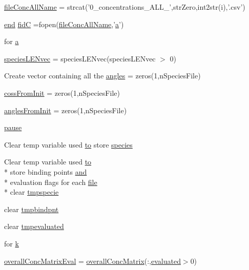 \begin{DoxyCompactItemize}
\item 
\hyperlink{a00025_a45b397c4e1bd8e68da97ba6d26fbb41f}{file\+Conc\+All\+Name} = strcat('0\+\_\+concentrations\+\_\+\+A\+L\+L\+\_\+',str\+Zero,int2str(i),'.\+csv')
\item 
\hyperlink{a00025_afb358f48b1646c750fb9da6c6585be2b}{end} \hyperlink{a00025_a5650dbe23ad9065391c1ea56f8acd34c}{fid\+C} =fopen(\hyperlink{a00025_a45b397c4e1bd8e68da97ba6d26fbb41f}{file\+Conc\+All\+Name},'\hyperlink{a00035_a2ffdbad9ea59541e59cbd2b938e0770c}{a}')
\item 
for \hyperlink{a00025_a230414213a9710ed03b6cf8d2695ee94}{a}
\item 
\hyperlink{a00025_a728fdfd72d1bd5110134afd6e09e99da}{species\+L\+E\+Nvec} = species\+L\+E\+Nvec(species\+L\+E\+Nvec $>$ 0)
\item 
Create vector containing all the \hyperlink{a00025_aee6c8457aab4cc643bbdaea8794ca74e}{angles} = zeros(1,n\+Species\+File)
\item 
\hyperlink{a00025_a547b10724f74451f717078739944cc74}{coss\+From\+Init} = zeros(1,n\+Species\+File)
\item 
\hyperlink{a00025_a860d662b73220f44f28099dfa9d3de76}{angles\+From\+Init} = zeros(1,n\+Species\+File)
\item 
\hyperlink{a00025_afd7d49e17b69bd6bf3d7a649856c1067}{pause}
\item 
Clear temp variable used \hyperlink{a00028_af71dbe52628a3f83a77ab494817525c6}{to} store \hyperlink{a00025_a0e465545a27eaf9ca2c9710f744963c4}{species}
\item 
Clear temp variable used \hyperlink{a00028_af71dbe52628a3f83a77ab494817525c6}{to} \\*
store binding points \hyperlink{a00028_a170f8acb213f91bf71c77b1d20bceb33}{and} \\*
evaluation flags for each \hyperlink{a00110_a4e8353d6c62cf54bf4a1a8f63e56b8c3}{file} \\*
clear \hyperlink{a00025_a045ecd9b02a87529b837dde223b08719}{tmpspecie}
\item 
clear \hyperlink{a00025_a5767512ebb74a4931fc7193b57426f9f}{tmpbindpnt}
\item 
clear \hyperlink{a00025_a4e591f841c52d48a504874598be0542a}{tmpevaluated}
\item 
for \hyperlink{a00025_ab7005e24e9bb6ea9b6e14c4ac2614a31}{k}
\item 
\hyperlink{a00025_ad9fb43d1f2f660ac0e99cc638e5ac774}{overall\+Conc\+Matrix\+Eval} = \hyperlink{a00025_a576dd8edd1b0fd4cc65709a59b308518}{overall\+Conc\+Matrix}(\+:,\hyperlink{a00025_a5e1fe2a8074aede6ad4a7a0613f0f91c}{evaluated}$>$0)
\end{DoxyCompactItemize}


